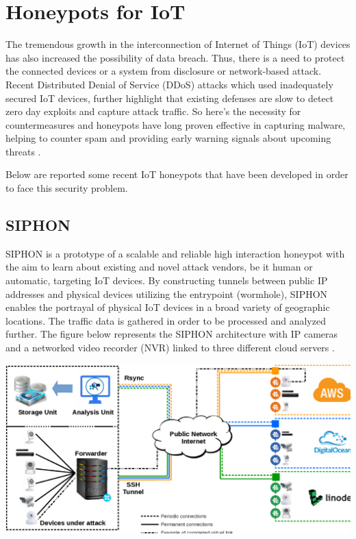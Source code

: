 \documentclass[epsfig,a4paper,11pt,titlepage,oneside,openany]{book}
\begin{document}
\chapter{Honeypots for IoT}
The tremendous growth in the interconnection of Internet of Things (IoT) devices has also increased the possibility of data breach. Thus, there is a need to protect the connected devices or a system from disclosure or network-based attack. Recent Distributed Denial of Service (DDoS) attacks which used inadequately secured IoT devices, further highlight that existing defenses are slow to detect zero day exploits and capture attack traffic. So here’s the necessity for countermeasures and honeypots have long proven effective in capturing malware, helping to counter spam and providing early warning signals about upcoming threats \cite{review}.

Below are reported some recent IoT honeypots that have been developed in order to face this security problem.

\section{SIPHON}

SIPHON is a prototype of a scalable and reliable high interaction honeypot with the aim to learn about existing and novel attack vendors, be it human or automatic, targeting IoT devices. By constructing tunnels between public IP addresses and physical devices utilizing the entrypoint (wormhole), SIPHON enables the portrayal of physical IoT devices in a broad variety of geographic locations. The traffic data is gathered in order to be processed and analyzed further. The figure below represents the SIPHON architecture with IP cameras and a networked video recorder (NVR) linked to three different cloud servers \cite{guarnizo2017siphon}.
\begin{center}
\includegraphics[scale=0.25]{SIPHON}
\end{center}
\end{document}
